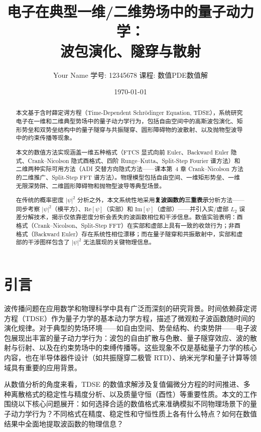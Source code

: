 \documentclass[12pt,a4paper]{article}
\title{\textbf{电子在典型一维/二维势场中的量子动力学：\\波包演化、隧穿与散射}}
\author{Your Name \quad 学号: 12345678 \quad 课程: 数值PDE数值解}
\date{\today}
\begin{document}
\maketitle

\begin{abstract}
\noindent 本文基于含时薛定谔方程（Time-Dependent Schr\"odinger Equation, TDSE），系统研究电子在一维和二维典型势场中的量子动力学行为，包括自由空间中的高斯波包演化、矩形势垒和双势垒结构中的量子隧穿与共振隧穿、圆形障碍物的波散射、以及抛物型波导中的约束传播等现象。

本文的数值方法实现涵盖一维五种格式（FTCS 显式向前 Euler、Backward Euler 隐式、Crank--Nicolson 隐式酉格式、四阶 Runge--Kutta、Split-Step Fourier 谱方法）和二维两种实际可用方法（ADI 交替方向隐式方法——课本第~4 章 Crank--Nicolson 方法的二维推广、Split-Step FFT 谱方法）。物理模型包括自由空间、一维矩形势垒、一维无限深势阱、二维圆形障碍物和抛物型波导等典型场景。

在传统的概率密度 $|\psi|^2$ 分析之外，本文系统性地采用\textbf{复波函数的三重表示}分析方法——同步考察 $|\psi|^2$（模平方）、$\mathrm{Re}[\psi]$（实部）和 $\mathrm{Im}[\psi]$（虚部）——并引入实/虚部 $L_2$ 误差分解技术，揭示仅依靠密度分析会丢失的波函数相位和干涉信息。数值实验表明：酉格式（Crank--Nicolson、Split-Step FFT）在实部和虚部上具有一致的收敛行为；非酉格式（Backward Euler）存在系统性相位漂移；而在量子隧穿和共振散射中，实部和虚部的干涉图样包含了 $|\psi|^2$ 无法展现的关键物理信息。
\end{abstract}

\tableofcontents
\newpage

\section{引言}

波传播问题在应用数学和物理科学中具有广泛而深刻的研究背景。时间依赖薛定谔方程（TDSE）作为量子力学的基本动力学方程，描述了微观粒子波函数随时间的演化规律。对于典型的势场环境——如自由空间、势垒结构、约束势阱——电子波包展现出丰富的量子动力学行为：波包的自由扩散与色散、量子隧穿效应、波的散射与衍射、以及在约束势场中的束缚传播等。这些现象不仅是基础量子力学的核心内容，也在半导体器件设计（如共振隧穿二极管 RTD）、纳米光学和量子计算等领域具有重要的应用背景。

从数值分析的角度来看，TDSE 的数值求解涉及复值偏微分方程的时间推进、多种离散格式的稳定性与精度分析、以及质量守恒（酉性）等重要性质。本文的工作围绕以下核心问题展开：如何选择合适的数值格式来准确模拟不同物理场景下的量子动力学行为？不同格式在精度、稳定性和守恒性质上各有什么特点？如何在数值结果中全面地提取波函数的物理信息？
\end{document}
